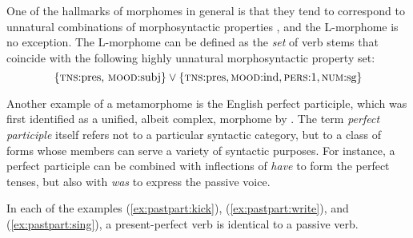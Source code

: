 One of the hallmarks of morphomes in general is that they tend to
correspond to unnatural combinations of morphosyntactic 
properties \citep{aronoff:md:2016}, and the L-morphome is no exception. 
The L-morphome can be defined as the \emph{set} of verb 
stems that coincide with the following highly unnatural morphosyntactic property set:
\begin{equation}
\{ \text{\textsc{tns}:pres, \textsc{mood}:subj}\} \vee \{\text{\textsc{tns}:pres},\text{\textsc{mood}:ind},\text{\textsc{pers}:1},\text{\textsc{num}:sg}\}
\end{equation}

Another example of a metamorphome is the English perfect participle, which was first 
identified as a unified, albeit complex, morphome by \cite{aronoff:1994}. The term \emph{perfect participle} 
itself refers not to a particular syntactic category, but 
to a class of 
forms whose members 
can serve a variety of  syntactic purposes. For instance, a perfect participle can be combined
with inflections of \emph{have} to form the perfect tenses, but also with 
\emph{was} to express the passive voice. 

In each of the examples (\ref{ex:pastpart:kick}), (\ref{ex:pastpart:write}), and (\ref{ex:pastpart:sing}), a present-perfect verb is identical to 
a passive verb.

